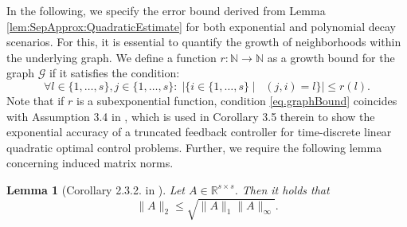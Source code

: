 \documentclass{article}
\def\N{\mathbb{N}}
\newcommand{\R}{\mathbb{R}}
\DeclareMathOperator{\distG}{\operatorname{dist_\mathcal{G}}} %
\newcommand{\agents}{\lbrace 1, \dots, s \rbrace}
\newtheorem{lemma}{Lemma}[section]
\begin{document}
In the following, we specify the error bound derived from Lemma \ref{lem:SepApprox:QuadraticEstimate} for both exponential and polynomial decay scenarios. For this, it is essential to quantify the growth of neighborhoods within the underlying graph.  
We define a function $r \colon \N \to \N$ as a growth bound for the graph $\mathcal{G}$ if it satisfies the condition: 
    \begin{equation} \label{eq.graphBound}
        \forall l \in \agents, j \in \agents:  \; \left\lvert \lbrace i \in \agents \mid \distG(j,i) = l \rbrace \right\rvert \leq r(l).
    \end{equation}
Note that if $r$ is a subexponential function, condition \eqref{eq.graphBound} coincides with Assumption 3.4 in \cite{shin2022lqr}, which is used in Corollary 3.5 therein to show the exponential accuracy of a truncated feedback controller for time-discrete linear quadratic optimal control problems. Further, we require the following lemma concerning induced matrix norms.
\begin{lemma}[Corollary 2.3.2. in \cite{golub2013matrix}] \label{lem.MatrixNormEstimate}
    Let $A \in \R^{s \times s}$. Then it holds that 
    \begin{equation*}
        \lVert A \rVert_2 \leq \sqrt{\lVert A \rVert_1 \lVert A \rVert_\infty}.
    \end{equation*}
\end{lemma}
\end{document}
